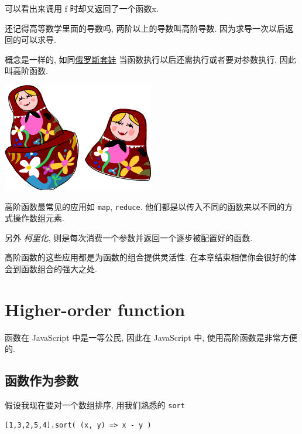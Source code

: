 \documentclass[a5paper]{book}
\begin{document}
可以看出来调用 f 时却又返回了一个函数x.

还记得高等数学里面的导数吗, 两阶以上的导数叫高阶导数.
因为求导一次以后返回的可以求导.

概念是一样的,
如同\href{https://en.wikipedia.org/wiki/Matryoshka_doll}{俄罗斯套娃} 当函数执行以后还需执行或者要对参数执行,
因此叫高阶函数.

\includegraphics[width=.9\linewidth]{./images/higherorder/recursion.png}

高阶函数最常见的应用如 \texttt{map}, \texttt{reduce}.
他们都是以传入不同的函数来以不同的方式操作数组元素.

另外 \emph{柯里化}, 则是每次消费一个参数并返回一个逐步被配置好的函数.

高阶函数的这些应用都是为函数的组合提供灵活性.
在本章结束相信你会很好的体会到函数组合的强大之处.

\chapter{Higher-order function}
\label{sec:orgheadline12}

函数在 JavaScript 中是一等公民, 因此在 JavaScript 中, 使用高阶函数是非常方便的.

\section{函数作为参数}
\label{sec:orgheadline10}

假设我现在要对一个数组排序, 用我们熟悉的 \texttt{sort}

\begin{verbatim}
[1,3,2,5,4].sort( (x, y) => x - y )
\end{verbatim}
\end{document}
